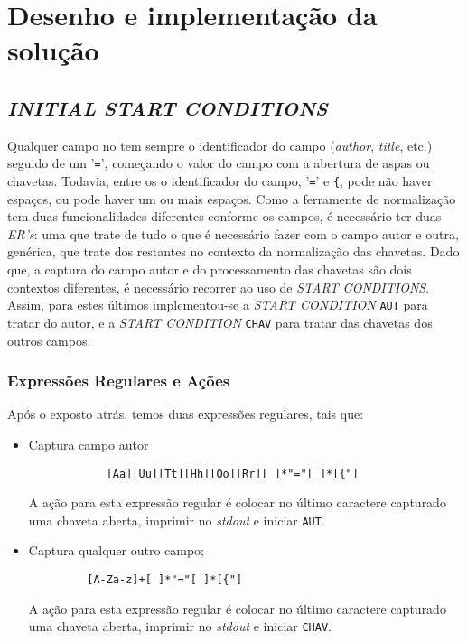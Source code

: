 \section{Desenho e implementação da solução}
\label{sec:des:b1}



\subsection{\emph{INITIAL \emph{START CONDITIONS}}}


Qualquer campo no  tem sempre o identificador do campo
(\emph{author}, \emph{title}, etc.) seguido de um '\texttt{=}', começando
o valor do campo com a abertura de aspas ou chavetas. Todavia, entre os
o identificador do campo, '\texttt{=}' e \texttt{\{}, pode não haver espaços, ou
pode haver um ou mais espaços. Como a ferramente de normalização tem duas
funcionalidades diferentes conforme os campos, é necessário ter duas
\emph{ER's}: uma que trate de tudo o que é necessário fazer com o campo autor
e outra, genérica, que trate dos restantes no contexto da normalização das
chavetas. Dado que, a captura do campo autor e do processamento das chavetas são
dois contextos diferentes, é necessário recorrer ao uso de \emph{START
CONDITIONS}. Assim, para estes últimos implementou-se a \emph{START 
CONDITION} \texttt{AUT} para tratar do autor, e a \emph{START
CONDITION} \texttt{CHAV} para tratar das chavetas dos outros campos.



\subsubsection{Expressões Regulares e Ações}
Após o exposto atrás, temos duas expressões regulares, tais que:

\begin{itemize}
	\item Captura campo autor
		\begin{verbatim}
			[Aa][Uu][Tt][Hh][Oo][Rr][ ]*"="[ ]*[{"]
		\end{verbatim}
A ação para esta expressão regular é colocar no último caractere capturado uma
chaveta aberta, imprimir no \emph{stdout} e iniciar \texttt{AUT}.
		

	\item Captura qualquer outro campo;
		\begin{verbatim}
		 [A-Za-z]+[ ]*"="[ ]*[{"]
		\end{verbatim}
A ação para esta expressão regular é colocar no último caractere capturado uma
chaveta aberta, imprimir no \emph{stdout} e iniciar \texttt{CHAV}.
\end{itemize}


